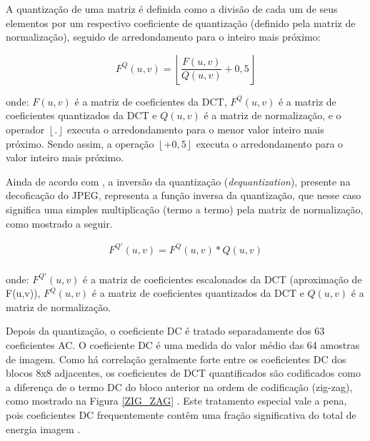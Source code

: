 A quantização de uma matriz é definida como a divisão de cada um de seus elementos por um respectivo coeficiente de quantização (definido pela matriz de normalização), seguido de arredondamento para o inteiro mais próximo:
\vspace{-3mm}
\begin{flushleft}
	\begin{equation}
		F^Q(u,v)=\left \lfloor \frac{F(u,v)}{Q(u,v)} +0,5 \right \rfloor
	\end{equation}
\end{flushleft}
onde:
			$F(u,v)$ é a matriz de coeficientes da DCT,
			$F^Q(u,v)$ é a matriz de coeficientes quantizados da DCT e
			$Q(u,v)$ é a matriz de normalização,
			e o operador $\left \lfloor . \right \rfloor$ executa o arredondamento para o menor valor inteiro mais próximo. Sendo assim, a operação $\left \lfloor  +0,5 \right \rfloor$ executa o arredondamento para o valor inteiro mais próximo.

			

Ainda de acordo com \cite{wallace1991jpeg}, a inversão da quantização (\textit{dequantization}), presente na decoficação do JPEG, representa a função inversa da quantização, que nesse caso significa uma simples multiplicação (termo a termo) pela matriz de normalização, como mostrado a seguir.
\vspace{-5mm}
\begin{center}
	\begin{equation}
		\begin{split}
			F^{Q'}(u,v) =F^Q(u,v) * Q(u,v) \\
		\end{split}
	\end{equation}
\end{center} 
onde:
			$F^{Q'}(u,v)$ é a matriz de coeficientes escalonados da DCT (aproximação de F(u,v)), 
			$F^Q(u,v)$ é a matriz de coeficientes quantizados da DCT e
			$Q(u,v)$ é a matriz de normalização.

Depois da quantização, o coeficiente DC é tratado separadamente dos 63 coeficientes AC. O coeficiente DC é uma medida do valor médio das 64 amostras de imagem. Como há correlação geralmente forte entre os coeficientes DC dos blocos 8x8 adjacentes, os coeficientes de DCT quantificados são codificados como a diferença de o termo DC do bloco anterior na ordem de codificação (zig-zag), como mostrado na Figura \ref{ZIG_ZAG} . Este tratamento especial vale a pena, pois coeficientes DC frequentemente contêm uma fração significativa do total de energia imagem \cite{wallace1991jpeg}.

